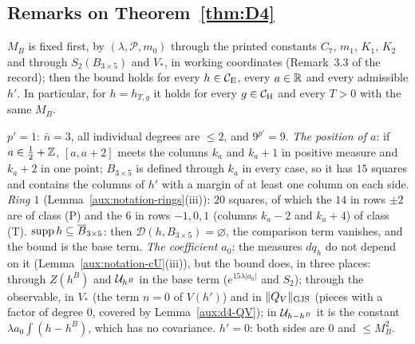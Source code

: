 \subsection{Remarks on Theorem~\ref{thm:D4}}\label{sub:d4-rem}

\begin{auxrem}\label{aux:d4-quant}
$M_B$ is fixed first, by $(\lambda,\mathscr P,m_0)$ through the printed constants $C_7$, $m_1$,
$K_1$, $K_2$ and through $S_2(B_{3\times5})$ and $V_*$, in working coordinates (Remark~3.3 of the
record); then the bound holds for every $h\in\mathcal{C}_{\mathrm E}$, every $a\in\mathbb{R}$ and every admissible $h'$.  In
particular, for $h=h_{T,g}$ it holds for every $g\in\mathcal{C}_{\mathrm H}$ and every $T>0$ with the same $M_B$.
\end{auxrem}

\begin{auxrem}\label{aux:d4-boundary}
\emph{$p'=1$}: $\bar n=3$, all individual degrees are $\le2$, and $9^{p'}=9$.
\emph{The position of $a$}: if $a\in\frac12+\mathbb{Z}$, $[a,a+2]$ meets the columns $k_a$ and $k_a+1$ in
positive measure and $k_a+2$ in one point; $B_{3\times5}$ is defined through $k_a$ in every case,
so it has $15$ squares and contains the columns of $h'$ with a margin of at least one column on
each side.
\emph{Ring $1$} (Lemma~\ref{aux:notation-rings}(iii)): $20$ squares, of which the $14$ in rows
$\pm2$ are of class (P) and the $6$ in rows $-1,0,1$ (columns $k_a-2$ and $k_a+4$) of class (T).
\emph{$\operatorname{supp} h\subseteq\overline B_{3\times5}$}: then $\mathcal D(h,B_{3\times5})=\varnothing$, the
comparison term vanishes, and the bound is the base term.
\emph{The coefficient $a_0$}: the measures $dq_h$ do not depend on it
(Lemma~\ref{aux:notation-cU}(iii)), but the bound does, in three places: through $Z(h^B)$ and
$\mathcal U_{h^B}$ in the base term ($e^{15\lambda|a_0|}$ and $S_2$); through the observable, in $V_*$ (the
term $n=0$ of $V(h')$) and in $\lVert Q_V\rVert_{\mathrm{GJS}}$ (pieces with a factor of degree $0$, covered by
Lemma~\ref{aux:d4-QV}); in $\mathcal U_{h-h^B}$ it is the constant $\lambda a_0\int(h-h^B)$, which has no
covariance.
\emph{$h'=0$}: both sides are $0$ and $\le M_B^2$.
\end{auxrem}

